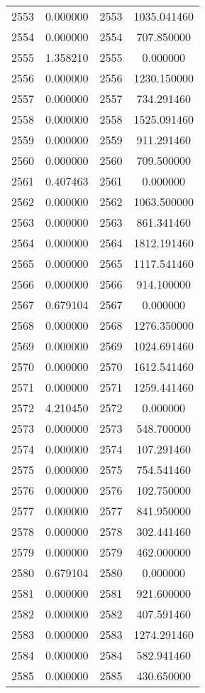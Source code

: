 \documentclass[12pt]{article}
\begin{document}
\begin{longtable}{@{}cccc@{}}
2553 & 0.000000 & 2553 & 1035.041460 \\
2554 & 0.000000 & 2554 & 707.850000 \\
2555 & 1.358210 & 2555 & 0.000000 \\
2556 & 0.000000 & 2556 & 1230.150000 \\
2557 & 0.000000 & 2557 & 734.291460 \\
2558 & 0.000000 & 2558 & 1525.091460 \\
2559 & 0.000000 & 2559 & 911.291460 \\
2560 & 0.000000 & 2560 & 709.500000 \\
2561 & 0.407463 & 2561 & 0.000000 \\
2562 & 0.000000 & 2562 & 1063.500000 \\
2563 & 0.000000 & 2563 & 861.341460 \\
2564 & 0.000000 & 2564 & 1812.191460 \\
2565 & 0.000000 & 2565 & 1117.541460 \\
2566 & 0.000000 & 2566 & 914.100000 \\
2567 & 0.679104 & 2567 & 0.000000 \\
2568 & 0.000000 & 2568 & 1276.350000 \\
2569 & 0.000000 & 2569 & 1024.691460 \\
2570 & 0.000000 & 2570 & 1612.541460 \\
2571 & 0.000000 & 2571 & 1259.441460 \\
2572 & 4.210450 & 2572 & 0.000000 \\
2573 & 0.000000 & 2573 & 548.700000 \\
2574 & 0.000000 & 2574 & 107.291460 \\
2575 & 0.000000 & 2575 & 754.541460 \\
2576 & 0.000000 & 2576 & 102.750000 \\
2577 & 0.000000 & 2577 & 841.950000 \\
2578 & 0.000000 & 2578 & 302.441460 \\
2579 & 0.000000 & 2579 & 462.000000 \\
2580 & 0.679104 & 2580 & 0.000000 \\
2581 & 0.000000 & 2581 & 921.600000 \\
2582 & 0.000000 & 2582 & 407.591460 \\
2583 & 0.000000 & 2583 & 1274.291460 \\
2584 & 0.000000 & 2584 & 582.941460 \\
2585 & 0.000000 & 2585 & 430.650000 \\

\end{longtable}
\end{document}
